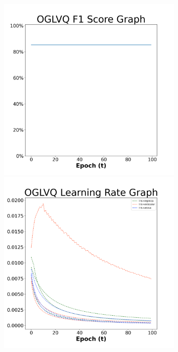 \begin{figure}[H]
    \centering %
\begin{subfigure}{0.3\textwidth}
  \includegraphics[width=\linewidth]{images/exper2/iris/OGLVQ_0.01_f1.png}
    \includegraphics[width=\linewidth]{images/exper2/iris/OGLVQ_0.01_lr.png}

\end{subfigure}
\end{figure}
